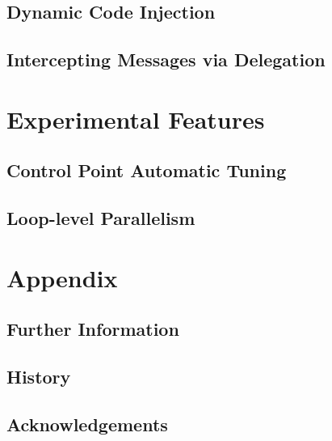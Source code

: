 \documentclass[10pt]{report}
\begin{document}
\chapter{Dynamic Code Injection}
\label{python}
  

\chapter{Intercepting Messages via Delegation}
\label{delegation}
  

%


\part{Experimental Features}

\chapter{Control Point Automatic Tuning}
\label{sec:controlpoint}
  

\chapter{Loop-level Parallelism}
\label{sec:ckloop}
  

\part{Appendix}
\appendix

%

\chapter{Further Information}
  

\chapter{History}
  

\chapter {Acknowledgements}
  


\end{document}
